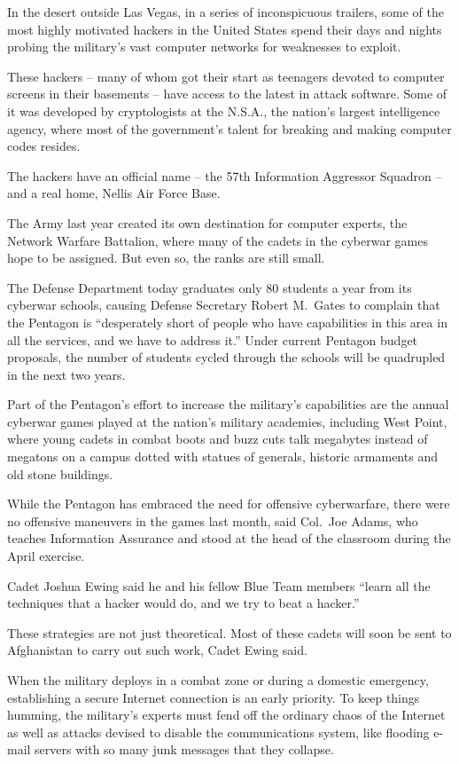 \documentclass[12pt,a4paper,onecolumn]{article}
\begin{document}
In the desert outside Las Vegas, in a series of inconspicuous trailers, some of the most highly
motivated hackers in the United States spend their days and nights probing the military's vast
computer networks for weaknesses to exploit.

These hackers -- many of whom got their start as teenagers devoted to computer screens in their
basements -- have access to the latest in attack software. Some of it was developed by cryptologists
at the N.S.A., the nation's largest intelligence agency, where most of the government's talent for
breaking and making computer codes resides.

The hackers have an official name -- the 57th Information Aggressor Squadron -- and a real home,
Nellis Air Force Base.

The Army last year created its own destination for computer experts, the Network Warfare Battalion,
where many of the cadets in the cyberwar games hope to be assigned. But even so, the ranks are still
small.

The Defense Department today graduates only 80 students a year from its cyberwar schools, causing
Defense Secretary Robert M.~Gates to complain that the Pentagon is ``desperately short of people who
have capabilities in this area in all the services, and we have to address it.'' Under current
Pentagon budget proposals, the number of students cycled through the schools will be quadrupled in
the next two years.

Part of the Pentagon's effort to increase the military's capabilities are the annual cyberwar games
played at the nation's military academies, including West Point, where young cadets in combat boots
and buzz cuts talk megabytes instead of megatons on a campus dotted with statues of generals,
historic armaments and old stone buildings.

While the Pentagon has embraced the need for offensive cyberwarfare, there were no offensive
maneuvers in the games last month, said Col.~Joe Adams, who teaches Information Assurance and stood
at the head of the classroom during the April exercise.

Cadet Joshua Ewing said he and his fellow Blue Team members ``learn all the techniques that a hacker
would do, and we try to beat a hacker.''

These strategies are not just theoretical. Most of these cadets will soon be sent to Afghanistan to
carry out such work, Cadet Ewing said.

When the military deploys in a combat zone or during a domestic emergency, establishing a secure
Internet connection is an early priority. To keep things humming, the military's experts must fend
off the ordinary chaos of the Internet as well as attacks devised to disable the communications
system, like flooding e-mail servers with so many junk messages that they collapse.
\end{document}
